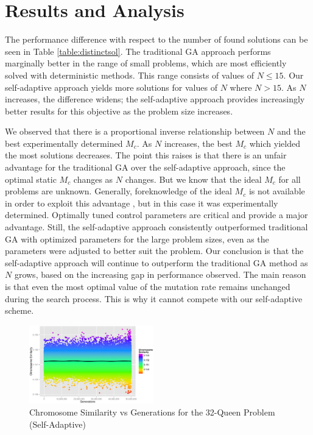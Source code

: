 \documentclass[conference]{IEEEtran}
\begin{document}
\section{Results and Analysis}
The performance difference with respect to the number of found solutions can be seen in Table \ref{table:distinctsol}. The traditional GA approach performs marginally better in the range of small problems, which are most efficiently solved with deterministic methods. This range consists of values of $N \leq 15$. Our self-adaptive approach yields more solutions for values of $N$ where $N > 15$. As $N$ increases, the difference widens; the self-adaptive approach provides increasingly better results for this objective as the problem size increases.

We observed that there is a proportional inverse relationship between $N$ and the best experimentally determined $M_{c}$. As $N$ increases, the best $M_{c}$ which yielded the most solutions decreases. The point this raises is that there is an unfair advantage for the traditional GA over the self-adaptive approach, since the optimal static $M_{c}$ changes as $N$ changes. But we know that the ideal $M_{c}$ for all problems are unknown. Generally, foreknowledge of the ideal $M_{c}$ is not available in order to exploit this advantage \cite{cit:14}, but in this case it was experimentally determined. Optimally tuned control parameters are critical and provide a major advantage. Still, the self-adaptive approach consistently outperformed traditional GA with optimized parameters for the large problem sizes, even as the parameters were adjusted to better suit the problem. Our conclusion is that the self-adaptive approach will continue to outperform the traditional GA method as $N$ grows, based on the increasing gap in performance observed. The main reason is that even the most optimal value of the mutation rate remains unchanged during the search process. This is why it cannot compete with our self-adaptive scheme.

\begin{figure}[htp]
\centerline{\includegraphics[width=0.48\textwidth]{figures/similarity_variable_32q_3.png}}
\caption{Chromosome Similarity vs Generations for the 32-Queen Problem (Self-Adaptive)} 
\label{fig:sim32q}
\end{figure}
\end{document}

